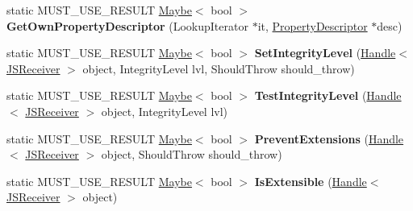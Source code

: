 \begin{DoxyCompactItemize}
\item 
static M\+U\+S\+T\+\_\+\+U\+S\+E\+\_\+\+R\+E\+S\+U\+LT \hyperlink{classv8_1_1_maybe}{Maybe}$<$ bool $>$ {\bfseries Get\+Own\+Property\+Descriptor} (Lookup\+Iterator $\ast$it, \hyperlink{classv8_1_1internal_1_1_property_descriptor}{Property\+Descriptor} $\ast$desc)\hypertarget{classv8_1_1internal_1_1_j_s_receiver_ab4b130ed80c06381434371dee3120628}{}\label{classv8_1_1internal_1_1_j_s_receiver_ab4b130ed80c06381434371dee3120628}

\item 
static M\+U\+S\+T\+\_\+\+U\+S\+E\+\_\+\+R\+E\+S\+U\+LT \hyperlink{classv8_1_1_maybe}{Maybe}$<$ bool $>$ {\bfseries Set\+Integrity\+Level} (\hyperlink{classv8_1_1internal_1_1_handle}{Handle}$<$ \hyperlink{classv8_1_1internal_1_1_j_s_receiver}{J\+S\+Receiver} $>$ object, Integrity\+Level lvl, Should\+Throw should\+\_\+throw)\hypertarget{classv8_1_1internal_1_1_j_s_receiver_a264aaba276fdda4368836a99fe0a902c}{}\label{classv8_1_1internal_1_1_j_s_receiver_a264aaba276fdda4368836a99fe0a902c}

\item 
static M\+U\+S\+T\+\_\+\+U\+S\+E\+\_\+\+R\+E\+S\+U\+LT \hyperlink{classv8_1_1_maybe}{Maybe}$<$ bool $>$ {\bfseries Test\+Integrity\+Level} (\hyperlink{classv8_1_1internal_1_1_handle}{Handle}$<$ \hyperlink{classv8_1_1internal_1_1_j_s_receiver}{J\+S\+Receiver} $>$ object, Integrity\+Level lvl)\hypertarget{classv8_1_1internal_1_1_j_s_receiver_ab9d6b00c4cf9053b219b8ae8cd7dc6d9}{}\label{classv8_1_1internal_1_1_j_s_receiver_ab9d6b00c4cf9053b219b8ae8cd7dc6d9}

\item 
static M\+U\+S\+T\+\_\+\+U\+S\+E\+\_\+\+R\+E\+S\+U\+LT \hyperlink{classv8_1_1_maybe}{Maybe}$<$ bool $>$ {\bfseries Prevent\+Extensions} (\hyperlink{classv8_1_1internal_1_1_handle}{Handle}$<$ \hyperlink{classv8_1_1internal_1_1_j_s_receiver}{J\+S\+Receiver} $>$ object, Should\+Throw should\+\_\+throw)\hypertarget{classv8_1_1internal_1_1_j_s_receiver_a94cfc04aa76778c6018f1b9bb547b2f5}{}\label{classv8_1_1internal_1_1_j_s_receiver_a94cfc04aa76778c6018f1b9bb547b2f5}

\item 
static M\+U\+S\+T\+\_\+\+U\+S\+E\+\_\+\+R\+E\+S\+U\+LT \hyperlink{classv8_1_1_maybe}{Maybe}$<$ bool $>$ {\bfseries Is\+Extensible} (\hyperlink{classv8_1_1internal_1_1_handle}{Handle}$<$ \hyperlink{classv8_1_1internal_1_1_j_s_receiver}{J\+S\+Receiver} $>$ object)\hypertarget{classv8_1_1internal_1_1_j_s_receiver_af6a76abc173764b5c32bffed5a200a76}{}\label{classv8_1_1internal_1_1_j_s_receiver_af6a76abc173764b5c32bffed5a200a76}


\end{DoxyCompactItemize}
